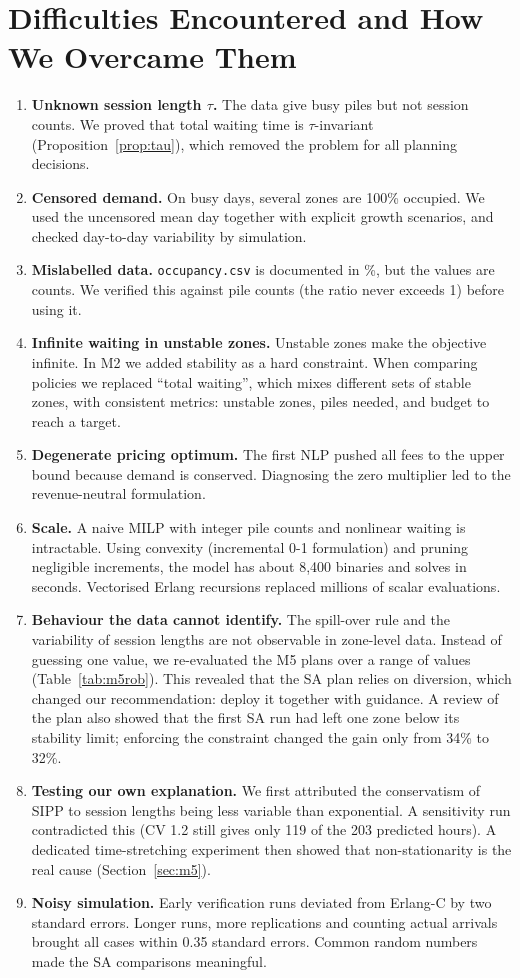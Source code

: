 \documentclass[11pt,a4paper]{article}
\begin{document}
\section{Difficulties Encountered and How We Overcame Them}
\begin{enumerate}[leftmargin=1.5em,itemsep=2pt]
\item \textbf{Unknown session length $\tau$.} The data give busy piles but not session counts. We proved that total waiting time is $\tau$-invariant (Proposition~\ref{prop:tau}), which removed the problem for all planning decisions.
\item \textbf{Censored demand.} On busy days, several zones are 100\% occupied. We used the uncensored mean day together with explicit growth scenarios, and checked day-to-day variability by simulation.
\item \textbf{Mislabelled data.} \texttt{occupancy.csv} is documented in \%, but the values are counts. We verified this against pile counts (the ratio never exceeds 1) before using it.
\item \textbf{Infinite waiting in unstable zones.} Unstable zones make the objective infinite. In M2 we added stability as a hard constraint. When comparing policies we replaced ``total waiting'', which mixes different sets of stable zones, with consistent metrics: unstable zones, piles needed, and budget to reach a target.
\item \textbf{Degenerate pricing optimum.} The first NLP pushed all fees to the upper bound because demand is conserved. Diagnosing the zero multiplier led to the revenue-neutral formulation.
\item \textbf{Scale.} A naive MILP with integer pile counts and nonlinear waiting is intractable. Using convexity (incremental 0-1 formulation) and pruning negligible increments, the model has about 8{,}400 binaries and solves in seconds. Vectorised Erlang recursions replaced millions of scalar evaluations.
\item \textbf{Behaviour the data cannot identify.} The spill-over rule and the variability of session lengths are not observable in zone-level data. Instead of guessing one value, we re-evaluated the M5 plans over a range of values (Table~\ref{tab:m5rob}). This revealed that the SA plan relies on diversion, which changed our recommendation: deploy it together with guidance. A review of the plan also showed that the first SA run had left one zone below its stability limit; enforcing the constraint changed the gain only from 34\% to 32\%.
\item \textbf{Testing our own explanation.} We first attributed the conservatism of SIPP to session lengths being less variable than exponential. A sensitivity run contradicted this (CV 1.2 still gives only 119 of the 203 predicted hours). A dedicated time-stretching experiment then showed that non-stationarity is the real cause (Section~\ref{sec:m5}).
\item \textbf{Noisy simulation.} Early verification runs deviated from Erlang-C by two standard errors. Longer runs, more replications and counting actual arrivals brought all cases within 0.35 standard errors. Common random numbers made the SA comparisons meaningful.
\end{enumerate}
\end{document}
